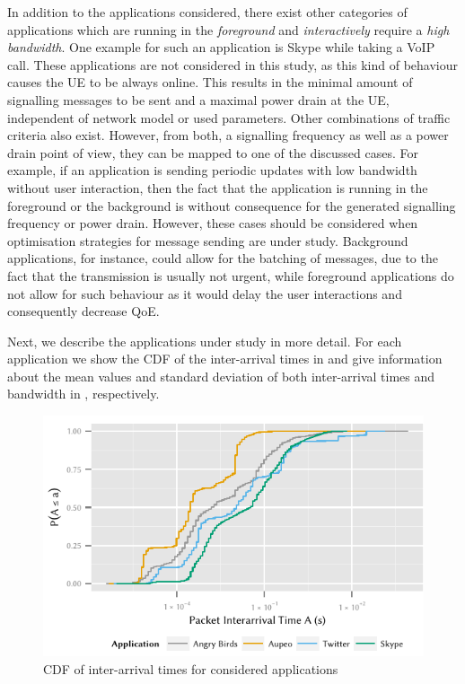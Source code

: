 In addition to the applications considered, there exist other categories of applications which are running in the \emph{foreground} and \emph{interactively} require a \emph{high bandwidth}.
One example for such an application is Skype while taking a \gls{VoIP} call.
These applications are not considered in this study, as this kind of behaviour causes the \gls{UE} to be always online.
This results in the minimal amount of signalling messages to be sent and a maximal power drain at the \gls{UE}, independent of network model or used parameters.
Other combinations of traffic criteria also exist.
However, from both, a signalling frequency as well as a power drain point of view, they can be mapped to one of the discussed cases.
For example, if an application is sending periodic updates with low bandwidth without user interaction, then the fact that the application is running in the foreground or the background is without consequence for the generated signalling frequency or power drain.
However, these cases should be considered when optimisation strategies for message sending are under study.
Background applications, for instance, could allow for the batching of messages, due to the fact that the transmission is usually not urgent, while foreground applications do not allow for such behaviour as it would delay the user interactions and consequently decrease \gls{QoE}.

Next, we describe the applications under study in more detail.
For each application we show the \gls{CDF} of the inter-arrival times in  and give information about the mean values and standard deviation of both inter-arrival times and bandwidth in , respectively.

\begin{figure}
\centering
\includegraphics{network/network_traces/numerical_results/figures/interarrival_times}
\caption{CDF of inter-arrival times for considered applications}\label{fig:network:network_traces:numerical_results:traffic:interarrival_times}
\end{figure}

